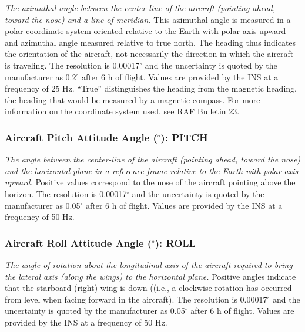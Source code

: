 \documentclass[
  english,
]{book}
\begin{document}
\emph{The azimuthal angle between the center-line of the aircraft
(pointing ahead, toward the nose) and a line of meridian.} This
azimuthal angle is measured in a polar coordinate system oriented
relative to the Earth with polar axis upward and azimuthal angle
measured relative to true north. The heading thus indicates the
orientation of the aircraft, not necessarily the direction in which the
aircraft is traveling. The resolution is 0.00017\(^{\circ}\) and the
uncertainty is quoted by the manufacturer as 0.2\(^{\circ}\) after 6 h
of flight. Values are provided by the INS at a frequency of 25 Hz.
``True'' distinguishes the heading from the magnetic heading, the
heading that would be measured by a magnetic compass. For more
information on the coordinate system used, see RAF Bulletin 23.

\hypertarget{pitch}{%
\subsubsection*{\texorpdfstring{Aircraft Pitch Attitude Angle
(\(^{\circ}\)):
PITCH}{Aircraft Pitch Attitude Angle (\^{}\{\textbackslash circ\}): PITCH}}\label{pitch}}

\emph{The angle between the center-line of the aircraft (pointing ahead,
toward the nose) and the horizontal plane in a reference frame relative
to the Earth with polar axis upward.} Positive values correspond to the
nose of the aircraft pointing above the horizon. The resolution is
0.00017\(^{\circ}\) and the uncertainty is quoted by the manufacturer as
0.05\(^{\circ}\) after 6 h of flight. Values are provided by the INS at
a frequency of 50 Hz.

\hypertarget{roll}{%
\subsubsection*{\texorpdfstring{Aircraft Roll Attitude Angle
(\(^{\circ}\)):
ROLL}{Aircraft Roll Attitude Angle (\^{}\{\textbackslash circ\}): ROLL}}\label{roll}}

\emph{The angle of rotation about the longitudinal axis of the aircraft
required to bring the lateral axis (along the wings) to the horizontal
plane.} Positive angles indicate that the starboard (right) wing is down
((i.e., a clockwise rotation has occurred from level when facing forward
in the aircraft). The resolution is 0.00017\(^{\circ}\) and the
uncertainty is quoted by the manufacturer as 0.05\(^{\circ}\) after 6 h
of flight. Values are provided by the INS at a frequency of 50 Hz.
\end{document}
